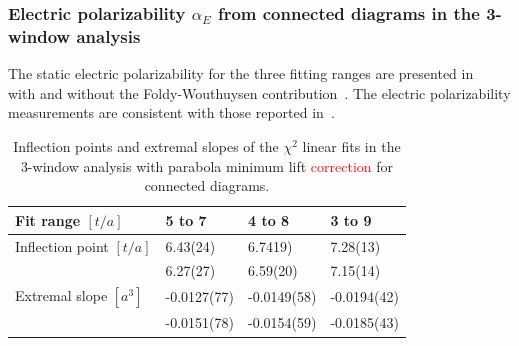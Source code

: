 
\subsubsection{Electric polarizability $\alpha_E$ from connected diagrams in the 3-window analysis}
\label{357}
 
 The static electric polarizability for the three fitting ranges are presented 
 in~ with and without the Foldy-Wouthuysen contribution~\cite{Saenz:2020yxy}. 
 The electric polarizability measurements are consistent with those reported in~\cite{Engelhardt:2009ryp}. 
 
\begin{table}[H]
\begin{center}
    \begin{tabular}{|l|l|l|l|}
    \hline
     Fit range $[t/a]$ 		& 5 to 7   	& 4 to 8   	& 3 to 9  	\\ \hline
     Inflection point $[t/a]$ 	& 6.43(24)& 6.7419) 	& 7.28(13) \\ 
     					& 6.27(27)	& 6.59(20)	& 7.15(14) \\ \hline
     Extremal slope $[a^3]$ & -0.0127(77) 	& -0.0149(58) 	& -0.0194(42) \\ 
     					& -0.0151(78) 	& -0.0154(59) 	& -0.0185(43) \\ \hline
    \end{tabular}
\end{center}
\caption{Inflection points and extremal slopes of the $\chi^2$ linear fits in the 3-window analysis with parabola minimum lift \textcolor{red}{correction} for connected diagrams. }
\label{Table:ConnectedMultipoint}
\end{table}


